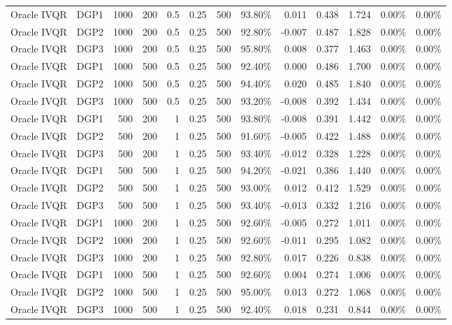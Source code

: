 \begin{landscape}
\begin{longtable}{llrrrrrrrrrrr}
Oracle IVQR & DGP1 & 1000 & 200 & 0.5 & 0.25 & 500 & 93.80\% & 0.011 & 0.438 & 1.724 & 0.00\% & 0.00\% \\
Oracle IVQR & DGP2 & 1000 & 200 & 0.5 & 0.25 & 500 & 92.80\% & -0.007 & 0.487 & 1.828 & 0.00\% & 0.00\% \\
Oracle IVQR & DGP3 & 1000 & 200 & 0.5 & 0.25 & 500 & 95.80\% & 0.008 & 0.377 & 1.463 & 0.00\% & 0.00\% \\
Oracle IVQR & DGP1 & 1000 & 500 & 0.5 & 0.25 & 500 & 92.40\% & 0.000 & 0.486 & 1.700 & 0.00\% & 0.00\% \\
Oracle IVQR & DGP2 & 1000 & 500 & 0.5 & 0.25 & 500 & 94.40\% & 0.020 & 0.485 & 1.840 & 0.00\% & 0.00\% \\
Oracle IVQR & DGP3 & 1000 & 500 & 0.5 & 0.25 & 500 & 93.20\% & -0.008 & 0.392 & 1.434 & 0.00\% & 0.00\% \\
Oracle IVQR & DGP1 & 500 & 200 & 1 & 0.25 & 500 & 93.80\% & -0.008 & 0.391 & 1.442 & 0.00\% & 0.00\% \\
Oracle IVQR & DGP2 & 500 & 200 & 1 & 0.25 & 500 & 91.60\% & -0.005 & 0.422 & 1.488 & 0.00\% & 0.00\% \\
Oracle IVQR & DGP3 & 500 & 200 & 1 & 0.25 & 500 & 93.40\% & -0.012 & 0.328 & 1.228 & 0.00\% & 0.00\% \\
Oracle IVQR & DGP1 & 500 & 500 & 1 & 0.25 & 500 & 94.20\% & -0.021 & 0.386 & 1.440 & 0.00\% & 0.00\% \\
Oracle IVQR & DGP2 & 500 & 500 & 1 & 0.25 & 500 & 93.00\% & 0.012 & 0.412 & 1.529 & 0.00\% & 0.00\% \\
Oracle IVQR & DGP3 & 500 & 500 & 1 & 0.25 & 500 & 93.40\% & -0.013 & 0.332 & 1.216 & 0.00\% & 0.00\% \\
Oracle IVQR & DGP1 & 1000 & 200 & 1 & 0.25 & 500 & 92.60\% & -0.005 & 0.272 & 1.011 & 0.00\% & 0.00\% \\
Oracle IVQR & DGP2 & 1000 & 200 & 1 & 0.25 & 500 & 92.60\% & -0.011 & 0.295 & 1.082 & 0.00\% & 0.00\% \\
Oracle IVQR & DGP3 & 1000 & 200 & 1 & 0.25 & 500 & 92.80\% & 0.017 & 0.226 & 0.838 & 0.00\% & 0.00\% \\
Oracle IVQR & DGP1 & 1000 & 500 & 1 & 0.25 & 500 & 92.60\% & 0.004 & 0.274 & 1.006 & 0.00\% & 0.00\% \\
Oracle IVQR & DGP2 & 1000 & 500 & 1 & 0.25 & 500 & 95.00\% & 0.013 & 0.272 & 1.068 & 0.00\% & 0.00\% \\
Oracle IVQR & DGP3 & 1000 & 500 & 1 & 0.25 & 500 & 92.40\% & 0.018 & 0.231 & 0.844 & 0.00\% & 0.00\% \\

\end{longtable}
\end{landscape}
